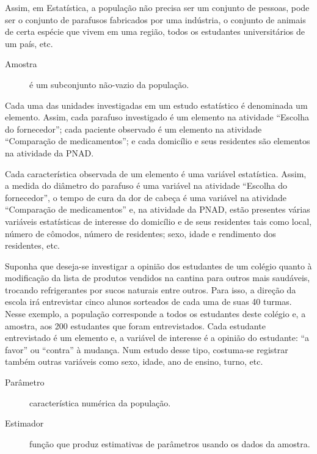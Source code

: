 Assim, em Estatística, a população não precisa ser um conjunto de pessoas, pode ser o conjunto de parafusos fabricados por uma indústria, o conjunto de animais de certa espécie que vivem em uma região, todos os estudantes universitários de um país, etc.
\begin{description}
\item[{Amostra}] \leavevmode{}\label{\detokenize{PE103-1:term-amostra}}
é um subconjunto não-vazio da população.

\end{description}

Cada uma das unidades investigadas em um estudo estatístico é denominada um elemento.  Assim, cada parafuso investigado é um elemento na atividade ``Escolha do fornecedor''; cada paciente observado é um elemento na atividade ``Comparação de medicamentos''; e cada domicílio e seus residentes são elementos na atividade da PNAD.

Cada característica observada de um elemento é uma variável estatística. Assim, a medida do diâmetro do parafuso é uma variável na atividade ``Escolha do fornecedor'', o tempo de cura da dor de cabeça é uma variável na atividade ``Comparação de medicamentos'' e, na atividade da PNAD, estão presentes várias variáveis estatísticas de interesse do domicílio e de seus residentes tais como local, número de cômodos, número de residentes; sexo, idade e rendimento dos residentes, etc.

Suponha que deseja-se investigar a opinião dos estudantes de um colégio quanto à modificação da lista de produtos vendidos na cantina para outros mais saudáveis, trocando refrigerantes por sucos naturais entre outros. Para isso, a direção da escola irá entrevistar cinco alunos sorteados de cada uma de suas 40 turmas. Nesse exemplo, a população corresponde a todos os estudantes deste colégio e, a amostra, aos 200 estudantes que foram entrevistados. Cada estudante entrevistado é um elemento e, a variável de interesse  é a opinião do estudante: ``a favor'' ou ``contra'' à mudança. Num estudo desse tipo, costuma-se registrar também outras variáveis como sexo, idade, ano de ensino, turno, etc.
\begin{description}
\item[{Parâmetro}] \leavevmode{}\label{\detokenize{PE103-1:term-parametro}}
característica numérica da população.

\end{description}
\begin{description}
\item[{Estimador}] \leavevmode{}\label{\detokenize{PE103-1:term-estimador}}
função que produz estimativas de parâmetros usando os dados da amostra.

\end{description}

